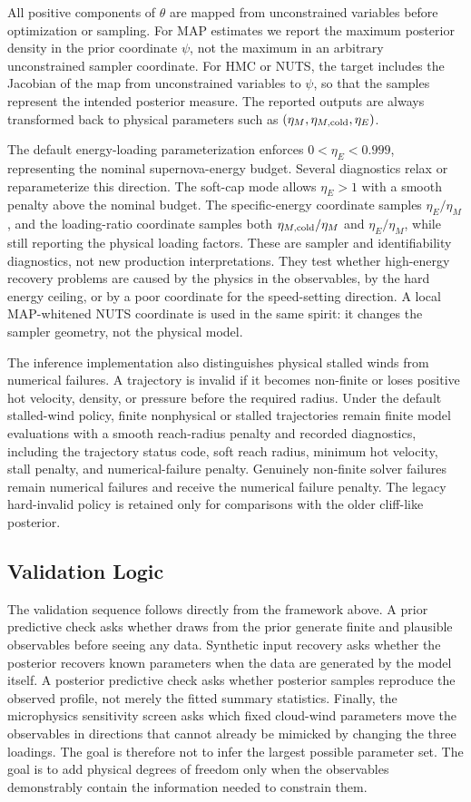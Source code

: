 All positive components of $\theta$ are mapped from unconstrained variables
before optimization or sampling.  For MAP estimates we report the maximum
posterior density in the prior coordinate $\psi$, not the maximum in an arbitrary
unconstrained sampler coordinate.  For HMC or NUTS, the target includes the
Jacobian of the map from unconstrained variables to $\psi$, so that the samples
represent the intended posterior measure.  The reported outputs are always
transformed back to physical parameters such as
$(\eta_M,\eta_{M,\rm cold},\eta_E)$.

The default energy-loading parameterization enforces $0<\eta_E<0.999$,
representing the nominal supernova-energy budget.  Several diagnostics relax or
reparameterize this direction.  The soft-cap mode allows $\eta_E>1$ with a
smooth penalty above the nominal budget.  The specific-energy coordinate samples
$\eta_E/\eta_M$, and the loading-ratio coordinate samples both
$\eta_{M,\rm cold}/\eta_M$ and $\eta_E/\eta_M$, while still reporting the
physical loading factors.  These are sampler and identifiability diagnostics,
not new production interpretations.  They test whether high-energy recovery
problems are caused by the physics in the observables, by the hard energy
ceiling, or by a poor coordinate for the speed-setting direction.  A local
MAP-whitened NUTS coordinate is used in the same spirit: it changes the sampler
geometry, not the physical model.

The inference implementation also distinguishes physical stalled winds from numerical
failures.  A trajectory is invalid if it becomes non-finite or loses positive
hot velocity, density, or pressure before the required radius.  Under the
default stalled-wind policy, finite nonphysical or stalled trajectories remain
finite model evaluations with a smooth reach-radius penalty and recorded
diagnostics, including the trajectory status code, soft reach radius, minimum
hot velocity, stall penalty, and numerical-failure penalty.  Genuinely
non-finite solver failures remain numerical failures and receive the numerical
failure penalty.  The legacy hard-invalid policy is retained only for
comparisons with the older cliff-like posterior.

\subsection{Validation Logic}
\label{subsec:inference_validation_logic}

The validation sequence follows directly from the framework above.  A prior
predictive check asks whether draws from the prior generate finite and plausible
observables before seeing any data.  Synthetic input recovery asks whether the
posterior recovers known parameters when the data are generated by the model
itself.  A posterior predictive check asks whether posterior samples reproduce
the observed profile, not merely the fitted summary statistics.  Finally, the
microphysics sensitivity screen asks which fixed cloud-wind parameters move the
observables in directions that cannot already be mimicked by changing the three
loadings.  The goal is therefore not to infer the largest possible parameter
set.  The goal is to add physical degrees of freedom only when the observables
demonstrably contain the information needed to constrain them.
